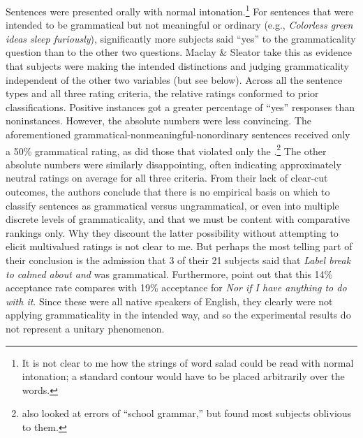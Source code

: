 Sentences were presented orally with normal  intonation.\footnote{It is not clear to me how the strings of word salad could be read with normal intonation; a standard contour would have to be placed arbitrarily over the words.}
For  sentences  that were intended to be grammatical but not meaningful or ordinary (e.g., \textit{Colorless green ideas sleep furiously}), significantly more subjects said ``yes'' to the grammaticality question than to the other two questions. Maclay \& Sleator take this as evidence that subjects were making the intended distinctions and judging grammaticality independent of the other two variables (but see below). Across all the sentence types and all three rating criteria, the relative ratings conformed to prior classifications. Positive instances got a greater percentage of ``yes'' responses than noninstances. However, the absolute numbers were less convincing. The aforementioned grammatical-nonmeaningful-nonordinary sentences received only  a 50\% grammatical rating, as did those that violated only the .\footnote{\citet{BradacEtAl1980} also looked at errors of ``school grammar,'' but found most subjects oblivious to them.}
 The other absolute numbers were similarly disappointing, often indicating approximately neutral ratings on average for all three criteria. From their lack of clear-cut outcomes, the authors conclude that there is no empirical basis on which to classify sentences as grammatical versus ungrammatical, or even into multiple discrete levels of grammaticality, and that we must be content with comparative rankings only. Why they discount the latter possibility without attempting to elicit multivalued ratings is not clear to me. But perhaps the most telling part of their conclusion is the admission that 3 of their 21 subjects said that \textit{Label  break  to calmed about and} was grammatical. Furthermore, \citet{QuirkEtAl1966} point
out that this 14\% acceptance rate compares with 19\% acceptance for \textit{Nor if I have anything to do with it}. Since these were all native speakers of English, they clearly were not applying grammaticality in the intended way, and so the experimental results do not represent a unitary phenomenon.

